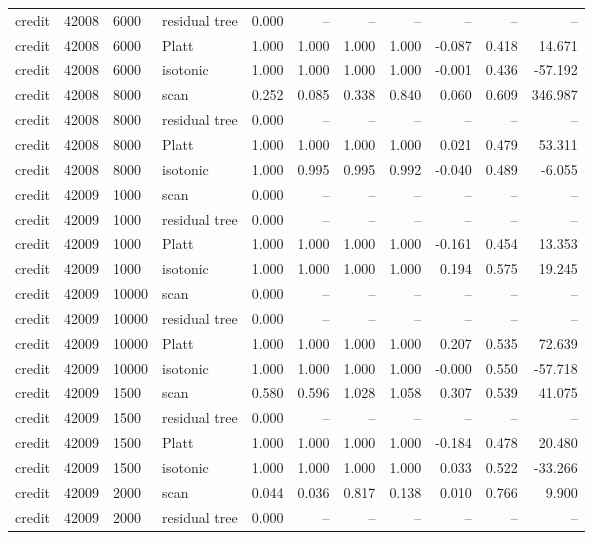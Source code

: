 \begin{tabular}{lrllrrrrrrr}
credit & 42008 & 6000 & residual tree & 0.000 & -- & -- & -- & -- & -- & -- \\
credit & 42008 & 6000 & Platt & 1.000 & 1.000 & 1.000 & 1.000 & -0.087 & 0.418 & 14.671 \\
credit & 42008 & 6000 & isotonic & 1.000 & 1.000 & 1.000 & 1.000 & -0.001 & 0.436 & -57.192 \\
credit & 42008 & 8000 & scan & 0.252 & 0.085 & 0.338 & 0.840 & 0.060 & 0.609 & 346.987 \\
credit & 42008 & 8000 & residual tree & 0.000 & -- & -- & -- & -- & -- & -- \\
credit & 42008 & 8000 & Platt & 1.000 & 1.000 & 1.000 & 1.000 & 0.021 & 0.479 & 53.311 \\
credit & 42008 & 8000 & isotonic & 1.000 & 0.995 & 0.995 & 0.992 & -0.040 & 0.489 & -6.055 \\
credit & 42009 & 1000 & scan & 0.000 & -- & -- & -- & -- & -- & -- \\
credit & 42009 & 1000 & residual tree & 0.000 & -- & -- & -- & -- & -- & -- \\
credit & 42009 & 1000 & Platt & 1.000 & 1.000 & 1.000 & 1.000 & -0.161 & 0.454 & 13.353 \\
credit & 42009 & 1000 & isotonic & 1.000 & 1.000 & 1.000 & 1.000 & 0.194 & 0.575 & 19.245 \\
credit & 42009 & 10000 & scan & 0.000 & -- & -- & -- & -- & -- & -- \\
credit & 42009 & 10000 & residual tree & 0.000 & -- & -- & -- & -- & -- & -- \\
credit & 42009 & 10000 & Platt & 1.000 & 1.000 & 1.000 & 1.000 & 0.207 & 0.535 & 72.639 \\
credit & 42009 & 10000 & isotonic & 1.000 & 1.000 & 1.000 & 1.000 & -0.000 & 0.550 & -57.718 \\
credit & 42009 & 1500 & scan & 0.580 & 0.596 & 1.028 & 1.058 & 0.307 & 0.539 & 41.075 \\
credit & 42009 & 1500 & residual tree & 0.000 & -- & -- & -- & -- & -- & -- \\
credit & 42009 & 1500 & Platt & 1.000 & 1.000 & 1.000 & 1.000 & -0.184 & 0.478 & 20.480 \\
credit & 42009 & 1500 & isotonic & 1.000 & 1.000 & 1.000 & 1.000 & 0.033 & 0.522 & -33.266 \\
credit & 42009 & 2000 & scan & 0.044 & 0.036 & 0.817 & 0.138 & 0.010 & 0.766 & 9.900 \\
credit & 42009 & 2000 & residual tree & 0.000 & -- & -- & -- & -- & -- & -- \\

\end{tabular}
